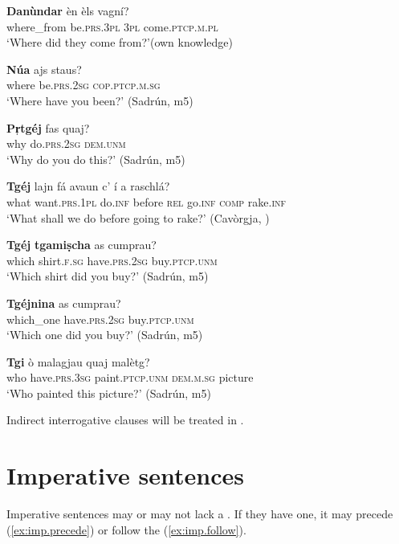 \ea
\label{ex:int11}
\gll \textbf{Danùndar} èn èls vagní?\\
where\_from be.\textsc{prs.3pl} \textsc{3pl} come.\textsc{ptcp.m.pl}\\
\glt `Where did they come from?'(own knowledge)
\z

\ea
\label{ex:int3}
\gll \textbf{Núa} ajs staus?\\
where be.\textsc{prs.2sg} \textsc{cop.ptcp.m.sg}\\
\glt `Where have you been?' (Sadrún, m5)
\z

\ea
\label{ex:int5}
\gll \textbf{Pr̩tgéj} fas quaj?\\
why do.\textsc{prs.2sg} \textsc{dem.unm}\\
\glt `Why do you do this?' (Sadrún, m5)
\z

\ea
\label{ex:int2}
\gll \textbf{Tgéj} lajn fá avaun c' í a raschlá?\\
what want.\textsc{prs.1pl} do.\textsc{inf} before \textsc{rel} go.\textsc{inf} \textsc{comp} rake.\textsc{inf}\\
\glt `What shall we do before going to rake?' (Cavòrgja, \citealt[121]{Büchli1966})
\z

\ea
\label{ex:int6}
\gll \textbf{Tgéj} \textbf{tgamiṣcha} as cumprau?\\
which shirt.\textsc{f.sg} have.\textsc{prs.2sg} buy.\textsc{ptcp.unm}\\
\glt `Which shirt did you buy?' (Sadrún, m5)
\z

\ea
\label{ex:int7}
\gll \textbf{Tgéjnina} as cumprau?\\
which\_one have.\textsc{prs.2sg} buy.\textsc{ptcp.unm}\\
\glt `Which one did you buy?' (Sadrún, m5)
\z

\ea
\label{ex:int1}
\gll \textbf{Tgi} ò malagjau quaj malètg?\\
who have.\textsc{prs.3sg} paint.\textsc{ptcp.unm} \textsc{dem.m.sg} picture\\
\glt `Who painted this picture?' (Sadrún, m5)
\z

Indirect interrogative clauses will be treated in .


\section{Imperative sentences}\label{sec:5.3}
Imperative sentences may or may not lack a . If they have one, it may precede (\ref{ex:imp.precede}) or follow the  (\ref{ex:imp.follow}).

